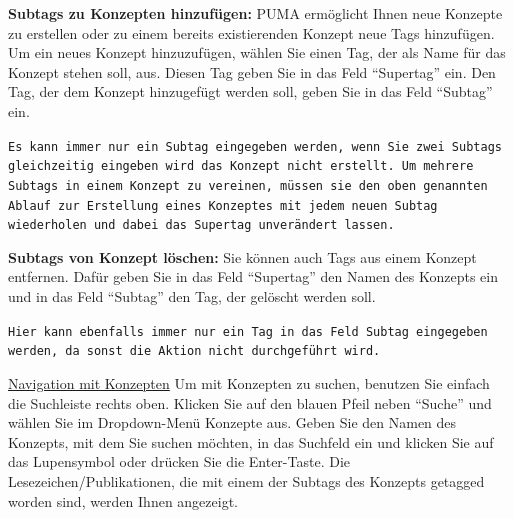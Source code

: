 \textbf{Subtags zu Konzepten hinzufügen:} PUMA ermöglicht Ihnen neue Konzepte zu erstellen oder zu einem bereits existierenden Konzept neue Tags hinzufügen. Um ein neues Konzept hinzuzufügen, wählen Sie einen Tag, der als Name für das Konzept stehen soll, aus. Diesen Tag geben Sie in das Feld \enquote{Supertag} ein. Den Tag, der dem Konzept hinzugefügt werden soll, geben Sie in das Feld \enquote{Subtag} ein.
\begin{mdframed}[style=mdfexample1,frametitle={\texttt{ACHTUNG}},backgroundcolor=gray!40]\texttt{Es kann immer nur ein Subtag eingegeben werden, wenn Sie zwei Subtags gleichzeitig eingeben wird das Konzept nicht erstellt. Um mehrere Subtags in einem Konzept zu vereinen, müssen sie den oben genannten Ablauf zur Erstellung eines Konzeptes mit jedem neuen Subtag wiederholen und dabei das Supertag unverändert lassen.} 
\end{mdframed}
\textbf{Subtags von Konzept löschen:} Sie können auch Tags aus einem Konzept entfernen. Dafür geben Sie in das Feld \enquote{Supertag} den Namen des Konzepts ein und in das Feld \enquote{Subtag} den Tag, der gelöscht werden soll. 
\begin{mdframed}[style=mdfexample1,frametitle={\texttt{ACHTUNG}},backgroundcolor=gray!40]\texttt{Hier kann ebenfalls immer nur ein Tag in das Feld Subtag eingegeben werden, da sonst die Aktion nicht durchgeführt wird.}
\end{mdframed}
\underline{Navigation mit Konzepten}
\newline
Um mit Konzepten zu suchen, benutzen Sie einfach die Suchleiste rechts oben. Klicken Sie auf den blauen Pfeil neben \enquote{Suche} und wählen Sie im Dropdown-Menü Konzepte aus. Geben Sie den Namen des Konzepts, mit dem Sie suchen möchten, in das Suchfeld ein und klicken Sie auf das Lupensymbol oder drücken Sie die Enter-Taste. Die Lesezeichen/Publikationen, die mit einem der Subtags des Konzepts getagged worden sind, werden Ihnen angezeigt. 
